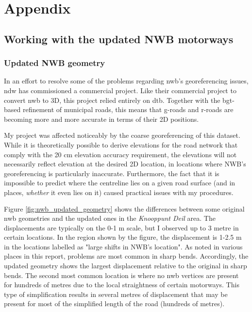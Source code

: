 
\chapter{Appendix}
\label{chap:app}

\section{Working with the updated NWB motorways}
\label{sec:nwb_updated}

\subsection{Updated NWB geometry}
\label{sub:nwb_updated_geometry}

In an effort to resolve some of the problems regarding \ac{nwb}'s georeferencing issues, \ac{ndw} has commissioned a commercial project. Like their commercial project to convert \ac{nwb} to 3D, this project relied entirely on \ac{dtb}. Together with the \ac{bgt}-based refinement of municipal roads, this means that \ac{g-roads} and \ac{r-roads} are becoming more and more accurate in terms of their 2D positions.

My project was affected noticeably by the coarse georeferencing of this dataset. While it is theoretically possible to derive elevations for the road network that comply with the 20 cm elevation accuracy requirement, the elevations will not necessarily reflect elevation at the desired 2D location, in locations where \ac{NWB}'s georeferencing is particularly inaccurate. Furthermore, the fact that it is impossible to predict where the centreline lies on a given road surface (and in places, \textit{whether} it even lies on it) caused practical issues with my procedures.

Figure \ref{fig:nwb_updated_geometry} shows the differences between some original \ac{nwb} geometries and the updated ones in the \textit{Knooppunt Deil} area. The displacements are typically on the 0-1 m scale, but I observed up to 3 metre in certain locations. In the region shown by the figure, the displacement is 1-2.5 m in the locations labelled as "large shifts in NWB's location". As noted in various places in this report, problems are most common in sharp bends. Accordingly, the updated geometry shows the largest displacement relative to the original in sharp bends. The second most common location is where no \ac{nwb} vertices are present for hundreds of metres due to the local straightness of certain motorways. This type of simplification results in several metres of displacement that may be present for most of the simplified length of the road (hundreds of metres).


